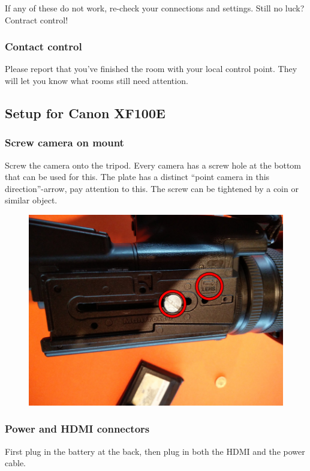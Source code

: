 \documentclass{article}
\begin{document}
If any of these do not work, re-check your connections and settings. Still no luck? Contract control!

\subsubsection{Contact control}
Please report that you've finished the room with your local control point.
They will let you know what rooms still need attention.

\subsection{Setup for Canon XF100E}

\subsubsection{Screw camera on mount}
Screw the camera onto the tripod. Every camera has a screw hole at the bottom that can be used for this. The plate has a distinct ``point camera in this direction''-arrow, pay attention to this. The screw can be tightened by a coin or similar object.

\begin{figure}[H]
  \centering
  \includegraphics[width = 120mm]{Cam00.jpg}
\end{figure}


\subsubsection{Power and HDMI connectors}
First plug in the battery at the back, then plug in both the HDMI and the power cable.
\end{document}
